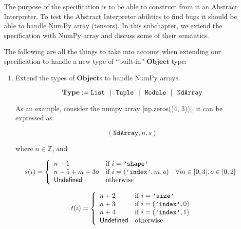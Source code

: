 The purpose of the specification is to be able to construct from it an
Abstract Interpreter. To test the Abstract Interpreter abilities to find
bugs it should be able to handle NumPy array (tensors). In this
subchapter, we extend the specification with NumPy array and discuss some
of their semantics.

The following are all the things to take into account when extending our
specification to handle a new type of \enquote{built-in} \(\mathbf{Object}\)
type:

\begin{enumerate}
\def\labelenumi{\arabic{enumi}.}
\item
  Extend the types of \(\mathbf{Object}\)s to handle NumPy arrays.

\[\mathbf{Type} := \texttt{List} ~~|~~ \texttt{Tuple} ~~|~~ \texttt{Module} ~~|~~
  \texttt{NdArray} \]


  As an example, consider the numpy array \pycode|np.zeros((4, 3))|, it
  can be expressed as:

  \[\left(\texttt{NdArray}, n, s\right)\]

  where \(n \in \mathbb{Z}\), and

  \[s(i) = \left\{
    \begin{array}{ll}
      n + 1          & \text{if } i = \texttt{'shape'} \\
      n + 5 + m + 3o & \text{if } i = (\texttt{'index'}, m, o) \quad \forall m \in [0, 3], o \in [0, 2] \\
      \mathsf{Undefined}        & \text{otherwise} \\
    \end{array}
  \right.\]

  \[t(i) = \left\{
    \begin{array}{ll}
      n + 2   & \text{if } i = \texttt{'size'} \\
      n + 3   & \text{if } i = (\texttt{'index'}, 0) \\
      n + 4   & \text{if } i = (\texttt{'index'}, 1) \\
      \mathsf{Undefined} & \text{otherwise} \\
    \end{array}
  \right.\]


\end{enumerate}
